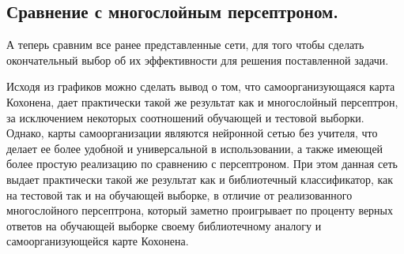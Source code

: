 \subsection{Сравнение с многослойным персептроном.}
А теперь сравним все ранее представленные сети, для того чтобы сделать окончательный выбор об их эффективности для решения поставленной задачи.
\begin{figure}[H]
\end{figure}
\begin{figure}[H]
\end{figure}
Исходя из графиков можно сделать вывод о том, что самоорганизующаяся карта Кохонена, дает практически такой же результат как и многослойный персептрон, за исключением некоторых соотношений обучающей и тестовой выборки. Однако, карты самоорганизации являются нейронной сетью без учителя, что делает ее более удобной и универсальной в использовании, а также имеющей более простую реализацию по сравнению с персептроном. При этом данная сеть выдает практически такой же результат как и библиотечный классификатор, как на тестовой так и на обучающей выборке, в отличие от реализованного многослойного персептрона, который заметно проигрывает по проценту верных ответов на обучающей выборке своему библиотечному аналогу и самоорганизующейся карте Кохонена.

